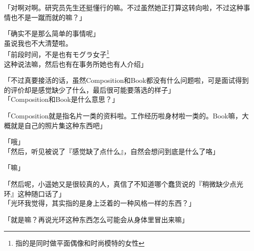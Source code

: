 「对啊对啊。研究员先生还挺懂行的嘛。不过虽然她正打算这转向啦，不过这种事情也不是一蹴而就的嘛？」

「确实不是那么简单的事情呢」\\

虽说我也不大清楚啦。\\

「前段时间，不是也有モグラ女子\footnote{指的是同时做平面偶像和时尚模特的女性}这种说法嘛，然后也有在事务所她也有人介绍」

「不过真要接活的话，虽然Composition和Book都没有什么问题啦，可是面试得到的评价却是感觉缺少了什么，最后很可能要落选的样子」\\

「Composition和Book是什么意思？」

「Composition就是指名片一类的资料啦。工作经历啦身材啦一类的。Book嘛，大概就是自己的照片集这种东西吧」

「哦」\\

「然后，听见被说了『感觉缺了点什么』，自然会想问到底是什么了咯」

「嘛」

「然后呢，小遥她又是很较真的人，真信了不知道哪个蠢货说的『稍微缺少点光环』这种随口话了」\\

「光环我觉得，其实指的是身上泛着的一种风格一样的东西？」

「就是嘛？再说光环这种东西怎么可能会从身体里冒出来嘛」\\

